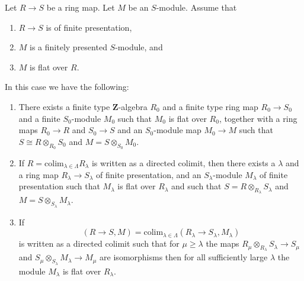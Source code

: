 \begin{lemma}
\label{lemma-flat-finite-presentation-limit-flat}
Let $R \to S$ be a ring map.
Let $M$ be an $S$-module.
Assume that
\begin{enumerate}
\item $R \to S$ is of finite presentation,
\item $M$ is a finitely presented $S$-module, and
\item $M$ is flat over $R$.
\end{enumerate}
In this case we have the following:
\begin{enumerate}
\item There exists a finite type $\mathbf{Z}$-algebra $R_0$ and
a finite type ring map $R_0 \to S_0$ and a finite $S_0$-module $M_0$
such that $M_0$ is flat over $R_0$, together with a ring maps
$R_0 \to R$ and $S_0 \to S$ and an $S_0$-module map $M_0 \to M$
such that $S \cong R \otimes_{R_0} S_0$ and $M = S \otimes_{S_0} M_0$.
\item If $R = \text{colim}_{\lambda \in \Lambda} R_\lambda$ is written
as a directed colimit, then there exists a $\lambda$ and a ring map
$R_\lambda \to S_\lambda$ of finite presentation, and an $S_\lambda$-module
$M_\lambda$ of finite presentation such that $M_\lambda$ is flat over
$R_\lambda$ and such that $S = R \otimes_{R_\lambda} S_\lambda$ and
$M = S \otimes_{S_{\lambda}} M_\lambda$.
\item If
$$
(R \to S, M) =
\text{colim}_{\lambda \in \Lambda}
(R_\lambda \to S_\lambda, M_\lambda)
$$
is written as a directed colimit such that for $\mu \geq \lambda$ the
maps $R_\mu \otimes_{R_\lambda} S_\lambda \to S_\mu$ and
$S_\mu \otimes_{S_\lambda} M_\lambda \to M_\mu$ are isomorphisms
then for all sufficiently large $\lambda$ the module $M_\lambda$
is flat over $R_\lambda$.
\end{enumerate}
\end{lemma}

